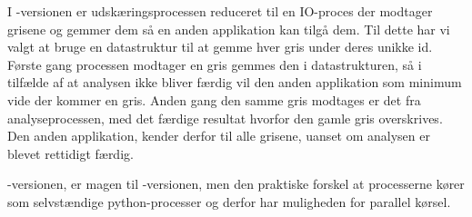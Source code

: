 I -versionen er udskæringsprocessen reduceret til en IO-proces der modtager grisene og gemmer dem så en anden applikation kan tilgå dem. Til dette har vi valgt at bruge en  datastruktur til at gemme  hver gris under deres unikke id. Første gang processen modtager en gris gemmes den i datastrukturen, så i tilfælde af at analysen ikke bliver færdig vil den anden applikation som minimum vide der kommer en gris. Anden gang den samme gris modtages er det fra analyseprocessen, med det færdige resultat hvorfor  den gamle gris overskrives. Den anden applikation, kender derfor til alle grisene, uanset om analysen er blevet rettidigt færdig.

-versionen, er magen til -versionen, men den praktiske forskel at processerne kører som selvstændige python-processer og derfor har muligheden for parallel kørsel. 

